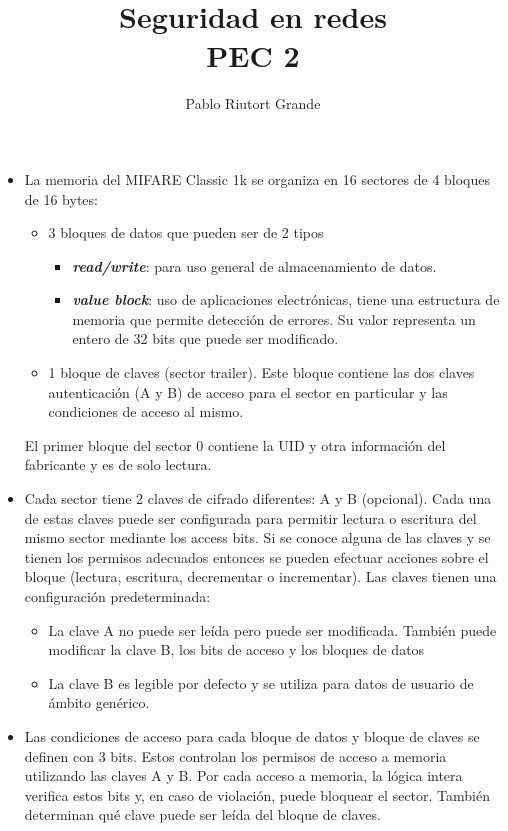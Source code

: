 \documentclass[10pt,a4paper]{article}
\author{Pablo Riutort Grande}
\title{Seguridad en redes\\ \vspace{1cm}\textbf{PEC 2}}
\begin{document}
\maketitle
\vspace{3cm}
\section{}
\begin{itemize}
\item La memoria del MIFARE Classic 1k se organiza en 16 sectores de 4 bloques de 16 bytes:
\begin{itemize}
\item 3 bloques de datos que pueden ser de 2 tipos
\begin{itemize}
\item \textit{\textbf{read/write}}: para uso general de almacenamiento de datos.
\item \textit{\textbf{value block}}: uso de aplicaciones electrónicas, tiene una estructura de memoria que permite detección de errores. Su valor representa un entero de 32 bits que puede ser modificado.
\end{itemize}
\item 1 bloque de claves (sector trailer). Este bloque contiene las dos claves autenticación (A y B) de acceso para el sector en particular y las condiciones de acceso al mismo.
\end{itemize}
El primer bloque del sector 0 contiene la UID y otra información del fabricante y es de solo lectura.
\item Cada sector tiene 2 claves de cifrado diferentes: A y B (opcional). Cada una de estas claves puede ser configurada para permitir lectura o escritura del mismo sector mediante los access bits. Si se conoce alguna de las claves y se tienen los permisos adecuados entonces se pueden efectuar acciones sobre el bloque (lectura, escritura, decrementar o incrementar). Las claves tienen una configuración predeterminada:
\begin{itemize}
\item La clave A no puede ser leída pero puede ser modificada. También puede modificar la clave B, los bits de acceso y los bloques de datos
\item La clave B es legible por defecto y se utiliza para datos de usuario de ámbito genérico.
\end{itemize}
\item Las condiciones de acceso para cada bloque de datos y bloque de claves se definen con 3 bits. Estos controlan los permisos de acceso a memoria utilizando las claves A y B. Por cada acceso a memoria, la lógica intera verifica estos bits y, en caso de violación, puede bloquear el sector. También determinan qué clave puede ser leída del bloque de claves.

\end{itemize}
\end{document}
